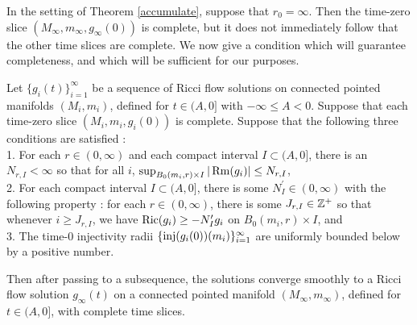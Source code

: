 In the setting of Theorem \ref{accumulate}, suppose that
$r_0 = \infty$. Then the time-zero slice $(M_\infty, m_\infty, g_\infty(0))$
is complete, but it does not immediately follow that the
other time slices are complete.  We now give a
condition which will guarantee completeness, and which will be
sufficient for our purposes.

\begin{corollary}
  \label{cor:kl-convergent-subsequences-ricci-flow-solutions-existence-convergent-subsequences-ricci-flow-solutions}

\label{accumulate2}
Let $\{g_i(t)\}_{i=1}^\infty$ be a sequence of Ricci flow solutions
on connected pointed manifolds $(M_i, m_i)$,
defined for $t \in (A, 0]$ with $-\infty \le A < 0$.
Suppose that each time-zero slice $(M_i, m_i, g_i(0))$ is complete.
Suppose that the following
three conditions are satisfied : \\
1. For each $r \in (0, \infty)$ and each compact interval $I \subset (A,0]$,
there is an $N_{r,I} < \infty$ so that for all $i$,
$\sup_{B_0(m_i, r) \times I} |\operatorname{Rm}(g_i)| \le N_{r,I}$,  \\
2. For each compact interval $I \subset (A, 0]$, there  is some
$N^\prime_I \in (0, \infty)$ with the following property : for each
$r \in (0, \infty)$, there is some $J_{r,I} \in {\mathbb Z}^+$ so that whenever
$i \ge J_{r,I}$, we have
$\operatorname{Ric}(g_i) \ge - N^\prime_I g_i$ on $B_0(m_i, r) \times I$, and \\
3. The
time-$0$ injectivity radii
$\{\operatorname{inj}(g_i(0))(m_i)\}_{i=1}^\infty$
are uniformly bounded below by a positive number.

Then after passing to a subsequence, the solutions converge smoothly
to a
Ricci flow solution $g_\infty(t)$ on a connected pointed manifold
$(M_\infty, m_\infty)$, defined for
$t \in (A, 0]$, with complete time slices.
\end{corollary}
